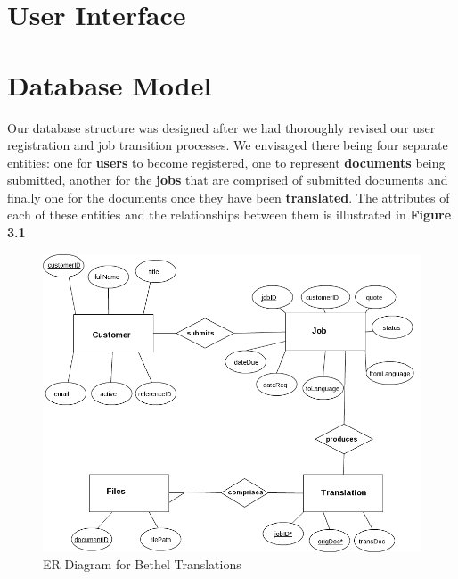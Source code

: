 \documentclass{l3proj}
\begin{document}



\section{User Interface}

\section{Database Model}

Our database structure was designed after we had thoroughly revised our user registration and job transition processes. We envisaged there being four separate entities: one for \textbf{users} to become registered, one to represent \textbf{documents} being submitted, another for the \textbf{jobs} that are comprised of submitted documents and finally one for the documents once they have been \textbf{translated}. The attributes of each of these entities and the relationships between them is illustrated in \textbf{Figure 3.1} 

\begin{figure}
\begin{center}
\includegraphics[width=\linewidth]{bt-dbstruct}
\caption{ER Diagram for Bethel Translations}
\end{center}
\end{figure}
\end{document}
